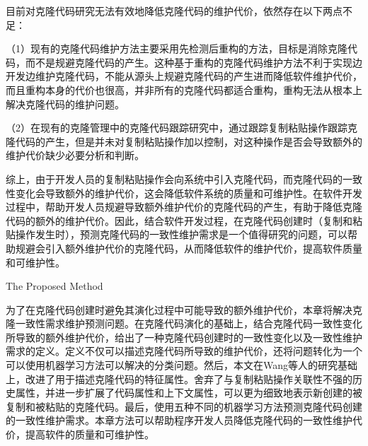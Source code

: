 目前对克隆代码研究无法有效地降低克隆代码的维护代价，依然存在以下两点不足：

（1）现有的克隆代码维护方法主要采用先检测后重构的方法，目标是消除克隆代码，而不是规避克隆代码的产生。这种基于重构的克隆代码维护方法不利于实现边开发边维护克隆代码，不能从源头上规避克隆代码的产生进而降低软件维护代价，而且重构本身的代价也很高，并非所有的克隆代码都适合重构，重构无法从根本上解决克隆代码的维护问题。

（2）在现有的克隆管理中的克隆代码跟踪研究中，通过跟踪复制粘贴操作跟踪克隆代码的产生，但是并未对复制粘贴操作加以控制，对这种操作是否会导致额外的维护代价缺少必要分析和判断。

综上，由于开发人员的复制粘贴操作会向系统中引入克隆代码，而克隆代码的一致性变化会导致额外的维护代价，这会降低软件系统的质量和可维护性。在软件开发过程中，帮助开发人员规避导致额外维护代价的克隆代码的产生，有助于降低克隆代码的额外的维护代价。因此，结合软件开发过程，在克隆代码创建时（复制和粘贴操作发生时），预测克隆代码的一致性维护需求是一个值得研究的问题，可以帮助规避会引入额外维护代价的克隆代码，从而降低软件的维护代价，提高软件质量和可维护性。%

{The Proposed Method}


为了在克隆代码创建时避免其演化过程中可能导致的额外维护代价，本章将解决克隆一致性需求维护预测问题。在克隆代码演化的基础上，结合克隆代码一致性变化所导致的额外维护代价，给出了一种克隆代码创建时的一致性变化以及一致性维护需求的定义。定义不仅可以描述克隆代码所导致的维护代价，还将问题转化为一个可以使用机器学习方法可以解决的分类问题。然后，本文在Wang\cite{wang2014predicting}等人的研究基础上，改进了用于描述克隆代码的特征属性。舍弃了与复制粘贴操作关联性不强的历史属性，并进一步扩展了代码属性和上下文属性，可以更为细致地表示新创建的被复制和被粘贴的克隆代码。最后，使用五种不同的机器学习方法预测克隆代码创建的一致性维护需求。本章方法可以帮助程序开发人员降低克隆代码的一致性维护代价，提高软件的质量和可维护性。

